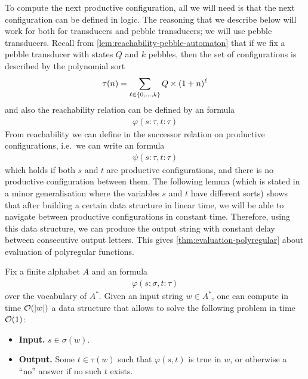 To compute the next productive configuration, all we will need is that the next configuration can be defined in \mso logic. The reasoning that we describe below will work for both for transducers and pebble transducers; we will use pebble transducers. Recall from \cref{lem:reachability-pebble-automaton} that if we fix a pebble transducer with states $Q$ and $k$ pebbles, then the set of configurations is described by the polynomial sort
\begin{align*}
    \tau(n) = \sum_{\ell \in \{0,\ldots,k\}} Q \times (1+n)^\ell
\end{align*}
and also the reachability relation can be defined by an \mso formula
\begin{align*}
    \varphi(s: \tau, t : \tau)
\end{align*}
From reachability we can define in \mso the successor relation on productive configurations, i.e.~we can write an \mso formula 
\begin{align*}
\psi(s : \tau, t : \tau)
\end{align*}
which holds if both $s$ and $t$ are productive configurations, and there is no productive configuration between them. The following lemma (which is stated in a minor generalisation where the variables $s$ and $t$ have different sorts) shows that after building a certain data structure in linear time, we will be able to navigate between productive configurations in constant time. Therefore, using this data structure, we can produce the output string with constant delay between consecutive output letters. This gives  \cref{thm:evaluation-polyregular} about evaluation of polyregular functions. 



\begin{lemma}\label{lem:evaluation-mso-successor-in-constant-time}
    Fix a finite alphabet  $A$ and  an \mso formula
\begin{align*}
\varphi(s : \sigma, t : \tau)
\end{align*}
over the vocabulary of $A^*$. Given an input string $w \in A^*$, one can compute in time ${\mathcal O}(|w|)$ a data structure that allows to solve the following  problem in time ${\mathcal O}(1)$:
    \begin{itemize}
    \item \textbf{Input.} $s \in \sigma(w)$.
    \item \textbf{Output.} Some $t \in \tau(w)$ such that $\varphi(s,t)$ is true in $w$, or otherwise a  ``no'' answer if no such  $t$ exists.
\end{itemize} 
\end{lemma}

